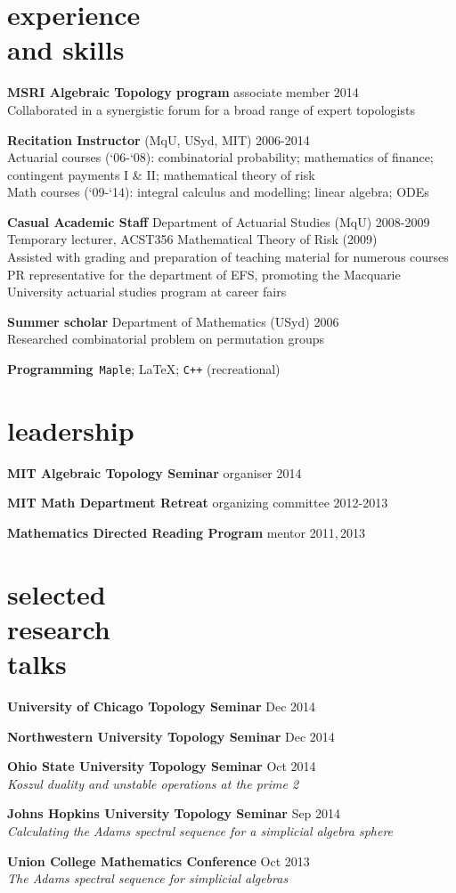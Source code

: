 \documentclass[margin,line]{resume}
\newcommand{\dashtab}{\makebox[1cm][r]{$-$ }}
\newcommand{\whitetab}{\makebox[1cm][r]{ }}
\newcommand{\CVsection}[1]{\section{\mysidestyle #1}}
\newcommand{\entry}[3]{\textbf{#1} #2 \hfill {#3}
           
\vspace{-3.4mm}}
\newcommand{\twolineentry}[4]{\textbf{#1} #2 \hfill {#4}\\%
#3
           
\vspace{-3.4mm}}
\newcommand{\FINALentry}[3]{\textbf{#1} #2 \hfill {#3}\\\vspace{-.55cm}}
\newcommand{\FINALtwolineentry}[4]{\textbf{#1} #2 \hfill {#4}\\%
#3\\\vspace{-.55cm}}
\begin{document}
\begin{resume}
\CVsection{experience\\and skills}
\twolineentry{MSRI Algebraic Topology program}{associate member}{\dashtab Collaborated in a synergistic forum for a broad range of expert topologists}{2014}
\twolineentry{Recitation Instructor}{(MqU, USyd, MIT)}{
\dashtab Actuarial courses (`06-`08): combinatorial probability; mathematics of finance;\\
\whitetab contingent payments I \& II; mathematical theory of risk \\
\dashtab Math courses (`09-`14): integral calculus and modelling; linear algebra; ODEs
}{2006-2014}
\twolineentry{Casual Academic Staff}{Department of Actuarial Studies (MqU)}{%
\dashtab Temporary lecturer, ACST356 Mathematical Theory of Risk (2009)\\
\dashtab Assisted with grading and preparation of teaching material for numerous courses\\
\dashtab PR representative for the department of EFS, promoting the Macquarie\\\whitetab University actuarial studies program at career fairs%
}{2008-2009}
\twolineentry{Summer scholar}{Department of Mathematics (USyd)}{%
\dashtab Researched combinatorial problem on permutation groups
}{2006}
\FINALentry{Programming}{\,\texttt{Maple}; \LaTeX; \texttt{C++} (recreational)}{}

\CVsection{leadership}
\entry{MIT Algebraic Topology Seminar}{organiser}{2014}
\entry{MIT Math Department Retreat}{organizing committee}{2012-2013}
\FINALentry{Mathematics Directed Reading Program}{mentor}{2011,\,2013}

\CVsection{selected\\research\\talks}
\entry{University of Chicago Topology Seminar}{}{Dec 2014}%
\entry{Northwestern University Topology Seminar}{}{Dec 2014}%
\twolineentry{Ohio State University Topology Seminar}{}{\whitetab \emph{Koszul duality and unstable operations at the prime 2}}{Oct 2014}%
\twolineentry{Johns Hopkins University Topology Seminar}{}{\whitetab \emph{Calculating the Adams spectral sequence for a simplicial algebra sphere}}{Sep 2014}%
\FINALtwolineentry{Union College Mathematics Conference}{}{\whitetab \emph{The Adams spectral sequence for simplicial algebras}}{Oct 2013}%


\end{resume}
\end{document}
